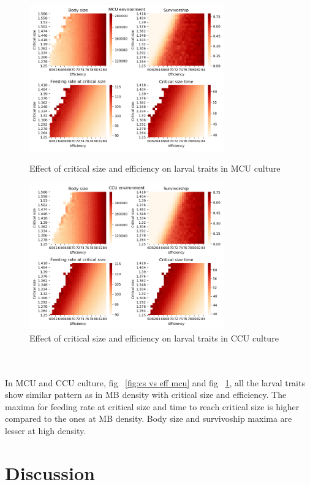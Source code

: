 \begin{figure}[!tbp]
  \centering
  \includegraphics[width=0.75\textwidth]{C3/Figs/Critical size_vs_Efficiency_MCU}
  \caption{Effect of critical size and efficiency on larval traits in MCU culture}
  \label{fig:cs vs eff mcu}
  \vspace{24pt}
  \includegraphics[width=0.75\textwidth]{C3/Figs/Critical size_vs_Efficiency_CCU}
  \caption{Effect of critical size and efficiency on larval traits in CCU culture}
  \label{fig:cs vs eff ccu}
\end{figure}\\\\
In MCU and CCU culture, fig ~\ref{fig:cs vs eff mcu} and fig ~\ref{fig:cs vs eff ccu}, all the larval traits show similar pattern as in MB density with critical size and efficiency. The maxima for feeding rate at critical size and time to reach critical size is higher compared to the ones at MB density. Body size and survivoship maxima are lesser at high density.
\section{Discussion}
\pagebreak


